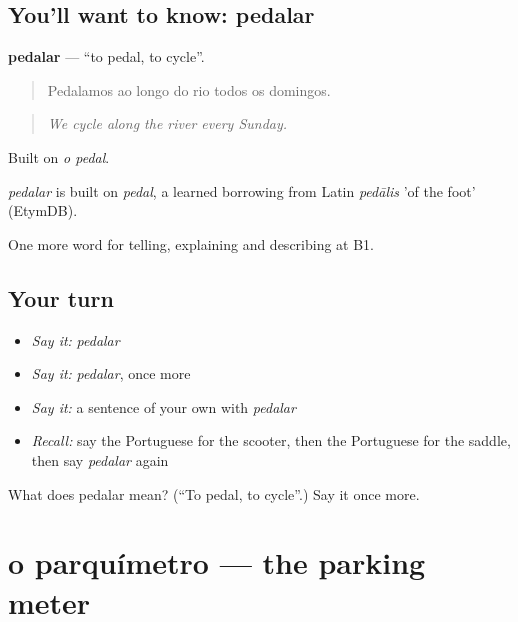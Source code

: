 \subsection*{You'll want to know: pedalar}
\textbf{pedalar} — \textquotedblleft{}to pedal, to cycle\textquotedblright{}.

\begin{quote}
Pedalamos ao longo do rio todos os domingos.
\end{quote}

\begin{quote}
\emph{We cycle along the river every Sunday.}
\end{quote}

Built on \emph{o pedal}.

\begin{cousinweb}
\emph{pedalar} is built on \emph{pedal}, a learned borrowing from Latin \emph{pedālis} 'of the foot' (EtymDB).
\end{cousinweb}

\begin{grammarlens}[title={What you've built}]
One more word for telling, explaining and describing at B1.
\end{grammarlens}

\subsection*{Your turn}
\begin{itemize}
\raggedright
  \item \emph{Say it:} \emph{pedalar}
  \item \emph{Say it:} \emph{pedalar}, once more
  \item \emph{Say it:} a sentence of your own with \emph{pedalar}
  \item \emph{Recall:} say the Portuguese for the scooter, then the Portuguese for the saddle, then say \emph{pedalar} again
\end{itemize}

\begin{tcolorbox}[breakable,colback=teal!4,colframe=teal!35!black,title={Before you move on}]
What does pedalar mean? (\textquotedblleft{}To pedal, to cycle\textquotedblright{}.) Say it once more.
\end{tcolorbox}
\section[o parquímetro]{o parquímetro — the parking meter}

